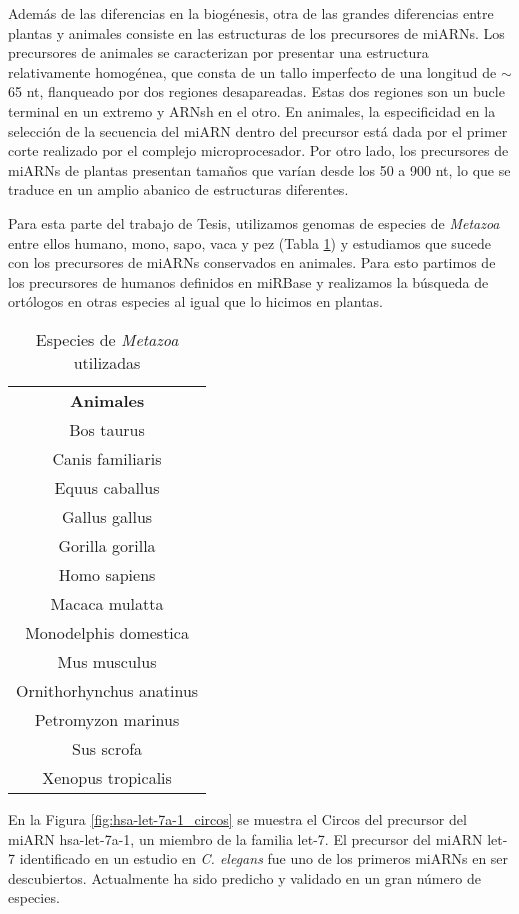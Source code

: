 Además de las diferencias en la biogénesis, otra de las grandes diferencias entre plantas y animales consiste en las estructuras de los precursores de miARNs.
Los precursores de animales se caracterizan por presentar una estructura relativamente homogénea, que consta de un tallo imperfecto de una longitud de $\sim$65 nt, flanqueado por dos regiones desapareadas.
Estas dos regiones son un bucle terminal en un extremo y ARNsh en el otro.
En animales, la especificidad en la selección de la secuencia del miARN dentro del precursor está dada por el primer corte realizado por el complejo microprocesador.
Por otro lado, los precursores de miARNs de plantas presentan tamaños que varían desde los 50 a 900 nt, lo que se traduce en un amplio abanico de estructuras diferentes.

Para esta parte del trabajo de Tesis, utilizamos genomas de especies de \textit{Metazoa} entre ellos humano, mono, sapo, vaca y pez (Tabla \ref{table:db_metazoa}) y estudiamos que sucede con los precursores de miARNs conservados en animales.
Para esto partimos de los precursores de humanos definidos en miRBase y realizamos la búsqueda de ortólogos en otras especies al igual que lo hicimos en plantas.

\begin{table}[!htbp]
\centering
\small
\caption{Especies de \textit{Metazoa} utilizadas}
\label{table:db_metazoa}
\begin{tabular}{c}
\textbf{Animales}        \\
	Bos taurus               \\
	Canis familiaris         \\
	Equus caballus           \\
	Gallus gallus            \\
	Gorilla gorilla          \\
	Homo sapiens             \\
	Macaca mulatta           \\
	Monodelphis domestica    \\
	Mus musculus             \\
	Ornithorhynchus anatinus \\
	Petromyzon marinus       \\
	Sus scrofa               \\
	Xenopus tropicalis      
\end{tabular}
\end{table}

En la Figura \ref{fig:hsa-let-7a-1_circos} se muestra el Circos del precursor del miARN hsa-let-7a-1, un miembro de la familia let-7.
El precursor del miARN let-7 identificado en un estudio en \textit{C. elegans} fue uno de los primeros miARNs en ser descubiertos.
Actualmente ha sido predicho y validado en un gran número de especies.

